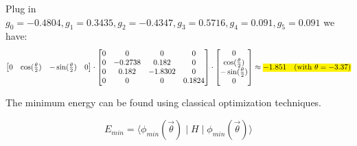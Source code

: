\documentclass{article}
\begin{document}
Plug in  \(g_0 = -0.4804, g_1 = 0.3435, g_2 = -0.4347, g_3 = 0.5716, g_4 = 0.091, g_5 = 0.091\) we have:
\[
	\begin{bmatrix}
		0 & \cos(\frac{\theta}{2}) & -\sin(\frac{\theta}{2}) & 0
	\end{bmatrix}
	\cdot
	\begin{bmatrix}
		0 & 0       & 0       & 0      \\
		0 & -0.2738 & 0.182   & 0      \\
		0 & 0.182   & -1.8302 & 0      \\
		0 & 0       & 0       & 0.1824
	\end{bmatrix}
	\cdot
	\begin{bmatrix}
		0                        \\
		\cos(\frac{\theta}{2})   \\
		- \sin(\frac{\theta}{2}) \\
		0
	\end{bmatrix}
	\approx \text{\hl{$-1.851 \quad (\text{with } \theta = -3.37)$}}
\]


The minimum energy can be found using classical optimization techniques.

\[E_{min} = \langle \phi_{min}(\vec{\theta}) \mid H \mid \phi_{min}(\vec{\theta}) \rangle\]
\end{document}
